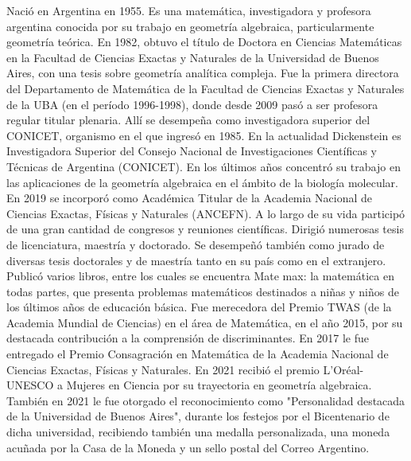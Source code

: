 \bigskip


\begin{parchment}{ Nació en Argentina en 1955.  Es una matemática, investigadora y profesora argentina conocida por su trabajo en geometría algebraica, particularmente geometría teórica. En 1982, obtuvo el título de Doctora en Ciencias Matemáticas en la Facultad de Ciencias Exactas y Naturales de la Universidad de Buenos Aires, con una tesis sobre geometría analítica compleja.
Fue la primera directora del Departamento de Matemática de la Facultad de Ciencias Exactas y Naturales de la UBA (en el período 1996-1998), donde desde 2009 pasó a ser profesora regular titular plenaria. Allí se desempeña como investigadora superior del CONICET, organismo en el que ingresó en 1985.
En la actualidad Dickenstein es Investigadora Superior del Consejo Nacional de Investigaciones Científicas y Técnicas de Argentina (CONICET). En los últimos años concentró su trabajo en las aplicaciones de la geometría algebraica en el ámbito de la biología molecular.
En 2019 se incorporó como Académica Titular de la Academia Nacional de Ciencias Exactas, Físicas y Naturales (ANCEFN). 
A lo largo de su vida participó de una gran cantidad de congresos y reuniones científicas. Dirigió numerosas tesis de licenciatura, maestría y doctorado. Se desempeñó también como jurado de diversas tesis doctorales y de maestría tanto en su país como en el extranjero.
Publicó varios libros, entre los cuales se encuentra Mate max: la matemática en todas partes, que presenta problemas matemáticos destinados a niñas y niños de los últimos años de educación básica.
Fue merecedora del Premio TWAS (de la Academia Mundial de Ciencias) en el área de Matemática, en el año 2015, por su destacada contribución a la comprensión de discriminantes.
En 2017 le fue entregado el Premio Consagración en Matemática de la Academia Nacional de Ciencias Exactas, Físicas y Naturales.
En 2021 recibió el premio L'Oréal-UNESCO a Mujeres en Ciencia por su trayectoria en geometría algebraica.
También en 2021 le fue otorgado el reconocimiento como "Personalidad destacada de la Universidad de Buenos Aires", durante los festejos por el Bicentenario de dicha universidad, recibiendo también una medalla personalizada, una moneda acuñada por la Casa de la Moneda y un sello postal del Correo Argentino.  \cite{AliDicK}}
\end{parchment}


\newpage

\bigskip


